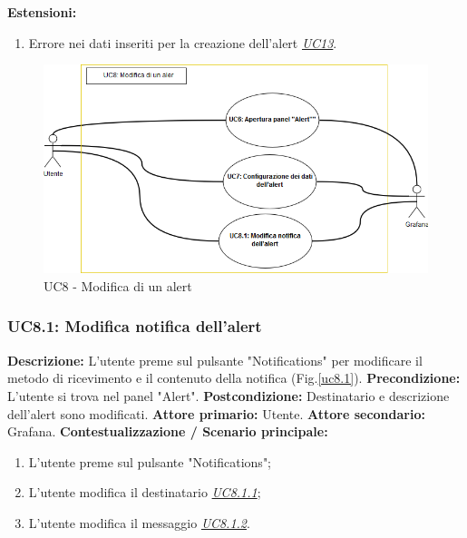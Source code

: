                     \textbf{Estensioni:} 
                    \begin{enumerate}
                            \item Errore nei dati inseriti per la creazione dell'alert \underline{\textit{UC13}}.
                        \end{enumerate} 		
                		
                        \begin{figure}[!htbp]
                    	\centering
                    	\includegraphics[width=\textwidth]{UC8.png}
                    	\caption{UC8 - Modifica di un alert}
                    	\label{uc8}
                    \end{figure}
                        
                      
                \subsubsection{UC8.1: Modifica notifica dell'alert }
                    \textbf{Descrizione:} L’utente preme sul pulsante "Notifications" per modificare il metodo di ricevimento e il contenuto della notifica (Fig.\ref{uc8.1}).
                    \newline
                    \textbf{Precondizione:} L'utente si trova nel panel "Alert".
                    \newline
                    \textbf{Postcondizione:} Destinatario e descrizione dell'alert sono modificati.
                    \newline
                    \textbf{Attore primario:} Utente.
                    \newline
                    \textbf{Attore secondario:} Grafana.
                    \newline
                    \textbf{Contestualizzazione / Scenario principale:} \begin{enumerate}
                            \item L'utente preme sul pulsante "Notifications";
                            \item L'utente modifica il destinatario \underline{\textit{UC8.1.1}};
                            \item L'utente modifica il messaggio \underline{\textit{UC8.1.2}}.
                        \end{enumerate}
                        
